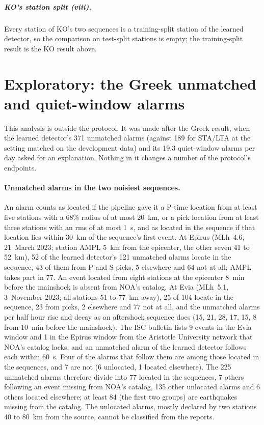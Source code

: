 \documentclass[11pt,a4paper]{article}
\newcommand{\stalta}{STA/LTA}
\begin{document}
\subparagraph{KO's station split (viii).} Every station of KO's two sequences is a
training-split station of the learned detector, so the comparison on test-split
stations is empty; the training-split result is the KO result above.


\clearpage
\section{Exploratory: the Greek unmatched and quiet-window alarms}\label{s:exploratory}

This analysis is outside the protocol. It was made after the Greek result, when the
learned detector's 371 unmatched alarms (against 189 for \stalta{} at the setting
matched on the development data) and its 19.3 quiet-window alarms per day asked for an
explanation. Nothing in it changes a number of the protocol's endpoints.

\paragraph{Unmatched alarms in the two noisiest sequences.} An alarm counts as located
if the pipeline gave it a P-time location from at least five stations with a 68\%
radius of at most 20~km, or a pick location from at least three stations with an rms
of at most 1~s, and as located in the sequence if that location lies within 30~km of
the sequence's first event. At Epirus (MLh~4.6, 21~March 2023; station AMPL 5~km from
the epicenter, the other seven 41 to 52~km), 52 of the learned detector's 121
unmatched alarms locate in the sequence, 43 of them from P and S picks, 5 elsewhere
and 64 not at all; AMPL takes part in 77. An event located from eight stations at the
epicenter 8~min before the mainshock is absent from NOA's catalog. At Evia (MLh~5.1,
3~November 2023; all stations 51 to 77~km away), 25 of 104 locate in the sequence, 23
from picks, 2 elsewhere and 77 not at all, and the unmatched alarms per half hour rise
and decay as an aftershock sequence does (15, 21, 28, 17, 15, 8 from 10~min before the
mainshock). The ISC bulletin lists 9 events in the Evia window and 1 in the Epirus
window from the Aristotle University network that NOA's catalog lacks, and an
unmatched alarm of the learned detector follows each within 60~s. Four of the alarms
that follow them are among those located in the sequences, and 7 are not (6 unlocated,
1 located elsewhere). The 225 unmatched alarms therefore divide into 77 located in
the sequences, 7 others following an event missing from NOA's catalog, 135 other
unlocated alarms and 6 others located elsewhere; at least 84 (the first two groups)
are earthquakes missing from the catalog. The unlocated alarms, mostly declared by two
stations 40 to 80~km from the source, cannot be classified from the reports.
\end{document}
